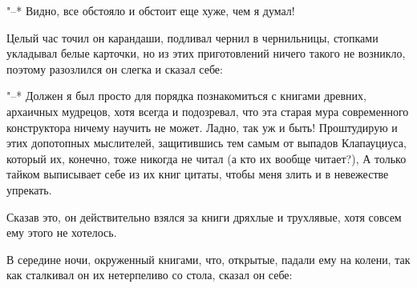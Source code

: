 "--* Видно, все обстояло и обстоит еще хуже, чем я думал!

Целый час точил он карандаши, подливал чернил в
чернильницы, стопками укладывал белые карточки, но из этих
приготовлений ничего такого не возникло, поэтому разозлился
он слегка и сказал себе:

"--* Должен я был просто для порядка познакомиться с
книгами древних, архаичных мудрецов, хотя всегда и
подозревал, что эта старая мура современного конструктора
ничему научить не может. Ладно, так уж и быть! Проштудирую и
этих допотопных мыслителей, защитившись тем самым от выпадов
Клапауциуса, который их, конечно, тоже никогда не читал (а
кто их вообще читает?), А только тайком выписывает себе из
их книг цитаты, чтобы меня злить и в невежестве упрекать.

Сказав это, он действительно взялся за книги дряхлые и
трухлявые, хотя совсем ему этого не хотелось.

В середине ночи, окруженный книгами, что, открытые,
падали ему на колени, так как сталкивал он их нетерпеливо со
стола, сказал он себе:

